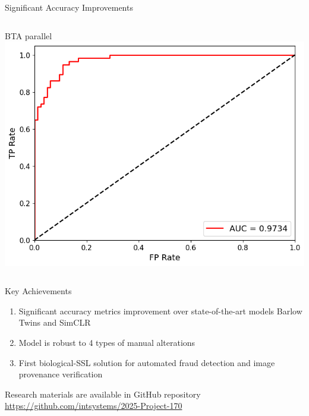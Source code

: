 \documentclass{beamer}
\begin{document}
\begin{frame}{Significant Accuracy Improvements}
\begin{columns}[T]
    \centering
    {\tiny BTA parallel} \\
    \includegraphics[width=1\textwidth]{fig/roc-auc-BTA-combined.png}
    
\end{columns}
\end{frame}



\begin{frame}{Key Achievements}
\begin{enumerate}
    \item Significant accuracy metrics improvement over state-of-the-art models Barlow Twins and SimCLR
    \item Model is robust to 4 types of manual alterations
    \item First biological-SSL solution for automated fraud detection and image provenance verification
\end{enumerate}

\begin{block}{Research materials are available in GitHub repository}
    \url{https://github.com/intsystems/2025-Project-170}
\end{block}
\end{frame}
\end{document}
